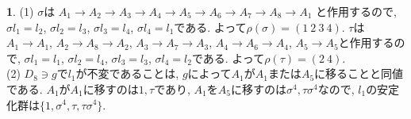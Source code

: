 \documentclass{amsart}
\theoremstyle{definition}
\newtheorem{ans}{}
\numberwithin{ans}{subsection}
\begin{document}
\begin{ans}
  (1) $\sigma$は
  $A_1 \rightarrow A_2 \rightarrow A_3 \rightarrow A_4 \rightarrow A_5 \rightarrow A_6 \rightarrow A_7 \rightarrow A_8 \rightarrow A_1$
  と作用するので,
  $\sigma l_1 = l_2$, $\sigma l_2 = l_3$, $\sigma l_3 = l_4$, $\sigma l_4 = l_1$である.
  よって$\rho(\sigma) = (1\ 2\ 3\ 4)$.
  $\tau$は$A_1 \rightarrow A_1$,
  $A_2 \rightarrow A_8 \rightarrow A_2$,
  $A_3 \rightarrow A_7 \rightarrow A_3$,
  $A_4 \rightarrow A_6 \rightarrow A_4$,
  $A_5 \rightarrow A_5$と作用するので,
  $\sigma l_1 = l_1$, $\sigma l_2 = l_4$, $\sigma l_3 = l_3$, $\sigma l_4 = l_2$である.
  よって$\rho(\tau) = (2\ 4)$.\\
  (2) $D_8 \ni g$で$l_1$が不変であることは, $g$によって$A_1$が$A_1$または$A_5$に移ることと同値である.
  $A_1$が$A_1$に移すのは$1, \tau$であり, $A_1$を$A_5$に移すのは$\sigma^4, \tau\sigma^4$なので,
  $l_1$の安定化群は$\{1, \sigma^4, \tau, \tau\sigma^4\}$.
\end{ans}
\end{document}
